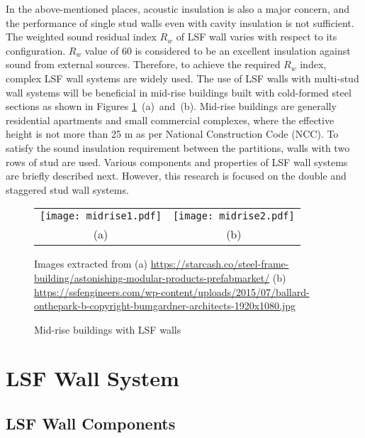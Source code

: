 In the above-mentioned places, acoustic insulation is also a major concern, and the performance of single stud walls even with cavity insulation is not sufficient. The weighted sound residual index $R_w$ of LSF wall varies with respect to its configuration. $R_w$ value of 60 is considered to be an excellent insulation against sound from external sources. Therefore, to achieve the required $R_w$ index, complex LSF wall systems are widely used. The use of LSF walls with multi-stud wall systems will be beneficial in mid-rise buildings built with cold-formed steel sections as shown in Figures \ref{fig:midrise}~(a)~and~(b). Mid-rise buildings are generally residential apartments and small commercial complexes, where the effective height is not more than 25 m as per National Construction Code (NCC). To satisfy the sound insulation requirement between the partitions, walls with two rows of stud are used. Various components and properties of LSF wall systems are briefly described next. However, this research is focused on the double and staggered stud wall systems.
	 
\begin{figure}[htbp]
	\centering	
		\begin{tabular}{cc}
			\texttt{[image: midrise1.pdf]} &
			\texttt{[image: midrise2.pdf]} \\
			(a) &
			(b) \\
		\end{tabular}
		\begin{scriptsize}
			Images extracted from (a) \url{https://starcash.co/steel-frame-building/astonishing-modular-products-prefabmarket/} (b) \url{https://ssfengineers.com/wp-content/uploads/2015/07/ballard-onthepark-b-copyright-bumgardner-architects-1920x1080.jpg}
			\end{scriptsize}	
		\caption{Mid-rise buildings with LSF walls}
		\label{fig:midrise}
\end{figure}

\section{LSF Wall System}
\subsection{LSF Wall Components}


